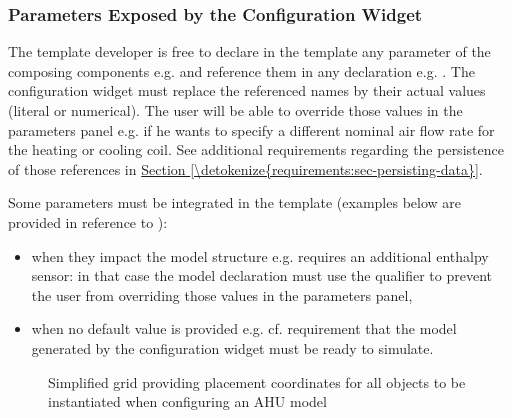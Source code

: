 \documentclass[letterpaper,10pt, openany,english]{sphinxmanual}
\begin{document}
\subsubsection{Parameters Exposed by the Configuration Widget}
\label{\detokenize{requirements:parameters-exposed-by-the-configuration-widget}}
The template developer is free to declare in the template any parameter of the composing components e.g.  and reference them in any declaration e.g. . The configuration widget must replace the referenced names by their actual values (literal or numerical). The user will be able to override those values in the parameters panel e.g. if he wants to specify a different nominal air flow rate for the heating or cooling coil. See additional requirements regarding the persistence of those references in \hyperref[\detokenize{requirements:sec-persisting-data}]{Section \ref{\detokenize{requirements:sec-persisting-data}}}.

Some parameters must be integrated in the template (examples below are provided in reference to ):
\begin{itemize}
\item {} 
when they impact the model structure e.g.  requires an additional enthalpy sensor: in that case the model declaration must use the  qualifier to prevent the user from overriding those values in the parameters panel,

\item {} 
when no default value is provided e.g.  cf. requirement that the model generated by the configuration widget must be ready to simulate.

\end{itemize}

\begin{figure}[htbp]
\centering
\capstart

\noindent{}
\caption{Simplified grid providing placement coordinates for all objects to be instantiated when configuring an AHU model}\label{\detokenize{requirements:grid}}\end{figure}
\end{document}
